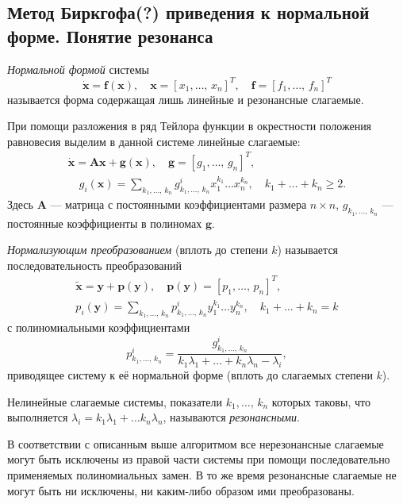 \documentclass[a4paper,12pt]{article}
\begin{document}
\subsection{Метод Биркгофа(?) приведения к нормальной форме. Понятие резонанса}
\begin{dfn}
	\emph{Нормальной формой} системы
	\[
		\dot{\mathbf{x}}=\mathbf{f}(\mathbf{x}),\quad
		\mathbf{x}=[x_1,\ldots,\,x_n]^T, \quad 
		\mathbf{f}=[f_1,\ldots,\,f_n]^T
	\]
	называется форма содержащая лишь линейные и резонансные слагаемые.
\end{dfn}
При помощи разложения в ряд Тейлора функции    в окрестности
положения равновесия выделим в данной системе линейные слагаемые:
\begin{gather*}
	\dot{\mathbf{x}}= \mathbf{Ax}+\boldsymbol{g}(\mathbf{x}),\quad
	\boldsymbol{g}=[g_1,\ldots,\,g_n]^T,\\ \quad g_i(\mathbf{x})=
	\sum_{k_1,\ldots,\,k_n}^{} g_{k_1,\ldots,\,k_n}^i x_1^{k_1}\ldots
	x_n ^{k_n},\quad k_1+\ldots+k_n \ge 2
.\end{gather*}
Здесь $\mathbf{A}$ --- матрица с постоянными коэффициентами размера $n \times n$,
$g_{k_1,\ldots,\,k_n}$ --- постоянные коэффициенты в полиномах $\boldsymbol{g}$.
\begin{dfn}
	\emph{Нормализующим преобразованием} (вплоть до степени $k$) 
	называется последовательность преобразований
	\begin{gather*}
		\tilde{\mathbf{x}}=\mathbf{y}+ \mathbf{p}(\mathbf{y}),\quad
		\mathbf{p}(\mathbf{y})=[p_1,\ldots,\,p_n]^T,\\
		p_i(\mathbf{y})= \sum_{k_1,\ldots,\,k_n}^{} p^i_{k_1,\ldots,\,k_n}
		y_1^{k_1}\ldots y_n^{k_n},\quad k_1+\ldots+k_n=k
	\end{gather*}
	с полиномиальными коэффициентами
	\[
	p_{k_1,\ldots,\,k_n}^i=\frac{g_{k_1,\ldots,\,k_n}^i}{k_1 \lambda_1+
	\ldots+k_n \lambda_n-\lambda_i}
	,\] 
	приводящее систему к её нормальной форме (вплоть до слагаемых степени
	$k$).
\end{dfn}
\begin{dfn}
	Нелинейные слагаемые системы, показатели $k_1,\ldots,\,k_n$ которых
	таковы, что выполняется $\lambda_i=k_1 \lambda_1+\ldots k_n \lambda_n$,
	называются \emph{резонансными}.
\end{dfn}
В соответствии с описанным выше алгоритмом все нерезонансные слагаемые могут
быть исключены из правой части системы при помощи последовательно применяемых
полиномиальных замен. В то же время резонансные слагаемые не могут быть ни
исключены, ни каким-либо образом ими преобразованы.
\end{document}
